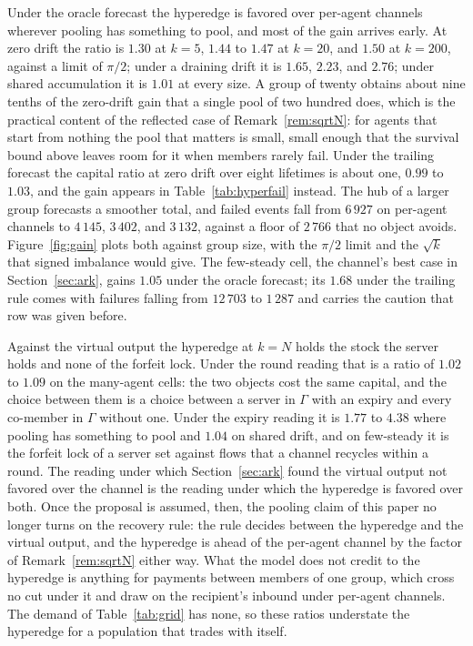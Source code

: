 \documentclass[11pt]{article}
\theoremstyle{plain}
\theoremstyle{definition}
\theoremstyle{remark}
\begin{document}


Under the oracle forecast the hyperedge is favored over per-agent channels wherever pooling has something to pool, and most of the gain arrives early. At zero drift the ratio is $1.30$ at $k=5$, $1.44$ to $1.47$ at $k=20$, and $1.50$ at $k=200$, against a limit of $\pi/2$; under a draining drift it is $1.65$, $2.23$, and $2.76$; under shared accumulation it is $1.01$ at every size. A group of twenty obtains about nine tenths of the zero-drift gain that a single pool of two hundred does, which is the practical content of the reflected case of Remark~\ref{rem:sqrtN}: for agents that start from nothing the pool that matters is small, small enough that the survival bound above leaves room for it when members rarely fail. Under the trailing forecast the capital ratio at zero drift over eight lifetimes is about one, $0.99$ to $1.03$, and the gain appears in Table~\ref{tab:hyperfail} instead. The hub of a larger group forecasts a smoother total, and failed events fall from $6\,927$ on per-agent channels to $4\,145$, $3\,402$, and $3\,132$, against a floor of $2\,766$ that no object avoids. Figure~\ref{fig:gain} plots both against group size, with the $\pi/2$ limit and the $\sqrt k$ that signed imbalance would give. The few-steady cell, the channel's best case in Section~\ref{sec:ark}, gains $1.05$ under the oracle forecast; its $1.68$ under the trailing rule comes with failures falling from $12\,703$ to $1\,287$ and carries the caution that row was given before.

Against the virtual output the hyperedge at $k=N$ holds the stock the server holds and none of the forfeit lock. Under the round reading that is a ratio of $1.02$ to $1.09$ on the many-agent cells: the two objects cost the same capital, and the choice between them is a choice between a server in $\Gamma$ with an expiry and every co-member in $\Gamma$ without one. Under the expiry reading it is $1.77$ to $4.38$ where pooling has something to pool and $1.04$ on shared drift, and on few-steady it is the forfeit lock of a server set against flows that a channel recycles within a round. The reading under which Section~\ref{sec:ark} found the virtual output not favored over the channel is the reading under which the hyperedge is favored over both. Once the proposal is assumed, then, the pooling claim of this paper no longer turns on the recovery rule: the rule decides between the hyperedge and the virtual output, and the hyperedge is ahead of the per-agent channel by the factor of Remark~\ref{rem:sqrtN} either way. What the model does not credit to the hyperedge is anything for payments between members of one group, which cross no cut under it and draw on the recipient's inbound under per-agent channels. The demand of Table~\ref{tab:grid} has none, so these ratios understate the hyperedge for a population that trades with itself.
\end{document}
